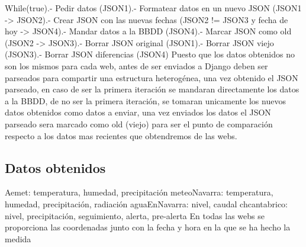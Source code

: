 While(true).- Pedir datos (JSON1).- Formatear datos en un nuevo JSON (JSON1 -> JSON2).- Crear JSON con las nuevas fechas (JSON2 != JSON3 y fecha de hoy -> JSON4).- Mandar datos a la BBDD (JSON4).- Marcar JSON como old (JSON2 -> JSON3).- Borrar JSON original (JSON1).- Borrar JSON viejo (JSON3).- Borrar JSON diferencias (JSON4)\newline
\newline
\newline
Puesto que los datos obtenidos no son los mismos para cada web, antes de ser enviados a Django deben ser parseados para compartir una estructura heterogénea, una vez obtenido el JSON parseado, en caso de ser la primera iteración se mandaran directamente los datos a la BBDD, de no ser la primera iteración, se tomaran unicamente los nuevos datos obtenidos como datos a enviar, una vez enviados los datos el JSON parseado sera marcado como old (viejo) para ser el punto de comparación respecto a los datos mas recientes que obtendremos de las webs.

\subsection{Datos obtenidos}
Aemet:\newline
temperatura, humedad, precipitación
\newline\newline
meteoNavarra:\newline
temperatura, humedad, precipitación, radiación
\newline\newline
aguaEnNavarra:\newline
nivel, caudal
\newline\newline
chcantabrico:\newline
nivel, precipitación, seguimiento, alerta, pre-alerta
\newline\newline
En todas las webs se proporciona las coordenadas junto con la fecha y hora en la que se ha hecho la medida

